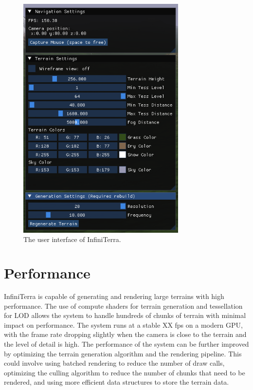 \documentclass{article}
\begin{document}
\begin{figure}[H]
	\centering
	\includegraphics[width=0.75\textwidth]{img/interface.png}
	\caption{The user interface of InfiniTerra.}
	\label{fig:interface}
\end{figure}

\section{Performance}
\label{ch:performance}


InfiniTerra is capable of generating and rendering large terrains with high performance. The use of
compute shaders for terrain generation and tessellation for LOD allows the system to handle
hundreds of chunks of terrain with minimal impact on performance. The system runs at a stable XX
fps on a modern GPU, with the frame rate dropping slightly when the camera is close to the terrain
and the level of detail is high. The performance of the system can be further improved by
optimizing the terrain generation algorithm and the rendering pipeline. This could involve using
batched rendering to reduce the number of draw calls, optimizing the culling algorithm to reduce
the number of chunks that need to be rendered, and using more efficient data structures to store
the terrain data.
\end{document}
